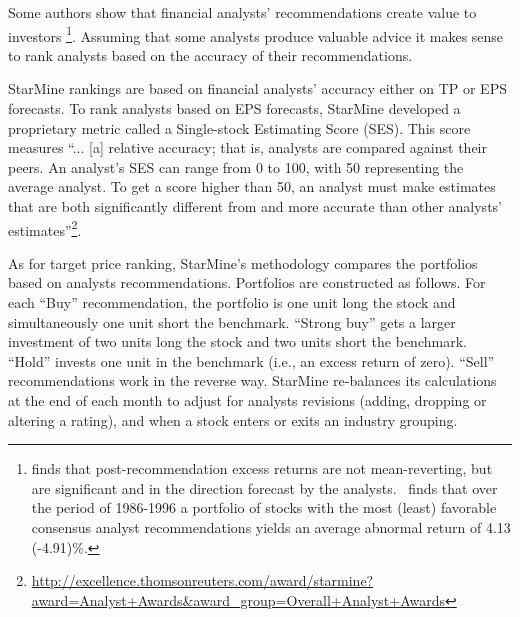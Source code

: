 \documentclass[a4paper,twoside,12pt,openright,notitlepage]{report}\usepackage[]{graphicx}\usepackage[]{color}
\begin{document}


Some authors show that financial analysts' recommendations create value to investors \citep{womack1996,barber2001}\footnote{\cite{womack1996} finds that  post-recommendation excess returns are not mean-reverting, but are significant and in the direction forecast by the analysts.~\cite{barber2001} finds that over the period of 1986-1996 a portfolio of stocks with the most (least) favorable consensus analyst recommendations yields an average abnormal return of 4.13 (-4.91)\%.}. Assuming that some analysts produce valuable advice it makes sense to rank analysts based on the accuracy of their recommendations.

StarMine rankings are based on financial analysts' accuracy either on TP or EPS forecasts. To rank analysts based on EPS forecasts, StarMine developed a proprietary metric called a Single-stock Estimating Score (SES). This score measures ``... [a] relative accuracy; that is, analysts are compared against their peers. An analyst's SES can range from 0 to 100, with 50 representing the average analyst. To get a score higher than 50, an analyst must make estimates that are both significantly different from and more accurate than other analysts' estimates''\footnote{\url{http://excellence.thomsonreuters.com/award/starmine?award=Analyst+Awards&award_group=Overall+Analyst+Awards}}.


As for target price ranking, StarMine's methodology compares the portfolios based on analysts recommendations. Portfolios are constructed as follows. For each ``Buy'' recommendation, the portfolio is one unit long the stock and simultaneously one unit short the benchmark. ``Strong buy'' gets a larger investment of two units long the stock and two units short the benchmark. ``Hold'' invests one unit in the benchmark (i.e., an excess return of zero). ``Sell'' recommendations work in the reverse way. StarMine re-balances its calculations at the end of each month to adjust for analysts revisions (adding, dropping or altering a rating), and when a stock enters or exits an industry grouping.
\end{document}
